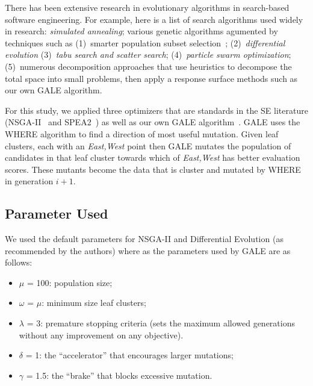 \documentclass{sig-alternative}
\begin{document}
    There has been extensive research in evolutionary algorithms in search-based software engineering.  For example, here is a list of search algorithms used widely in research: \textit{simulated annealing}\cite{bell2013limited, menzies2007business}; various genetic algorithms\cite{goldberg1979complexity} agumented by techniques such as
    (1)~smarter population subset selection~\cite{zit02,deb00afast};
    (2)~\textit{differential evolution} \cite{storn1997differential}
    (3)~\textit{tabu search and scatter search}\cite{nebro2008abyss, molina2007sspmo, glover1986general, beausoleil2006moss}; 
    (4)~\textit{particle swarm optimization}\cite{pan2008particle}; 
    (5)~numerous decomposition approaches that use heuristics to decompose the total space into small problems, then apply a response surface methods such
    as our own GALE\cite{krall2014gale,zuluaga2013active} algorithm.
    
    For this study, we applied three optimizers that are standards
    in the SE literature (NSGA-II~\cite{deb00afast} and SPEA2~\cite{zit02})
    as well as our own GALE algorithm~\cite{krall2014gale}.
    GALE uses the WHERE algorithm to find a direction of most useful
    mutation. Given leaf clusters, each with an {\em East,West} point
    then 
    GALE mutates the population of candidates in that leaf cluster towards
    which of {\em East,West} has better evaluation scores. These
    mutants become the data  that is cluster
    and mutated by WHERE in  generation $i+1$.
    
\subsection{Parameter Used}
We used the default parameters for NSGA-II and Differential Evolution (as recommended by the authors) where as the parameters used by GALE are as follows:
\begin{itemize}
\item $\mu$ = 100: population size;
\item $\omega$ = $\mu$: minimum size leaf clusters;
\item $\lambda$ = 3: premature stopping criteria (sets the maximum
allowed generations without any improvement
on any objective).
\item $\delta$ = 1: the ``accelerator'' that encourages larger
mutations;
\item $\gamma$ = 1.5: the ``brake'' that blocks excessive mutation.
\end{itemize}
\end{document}
